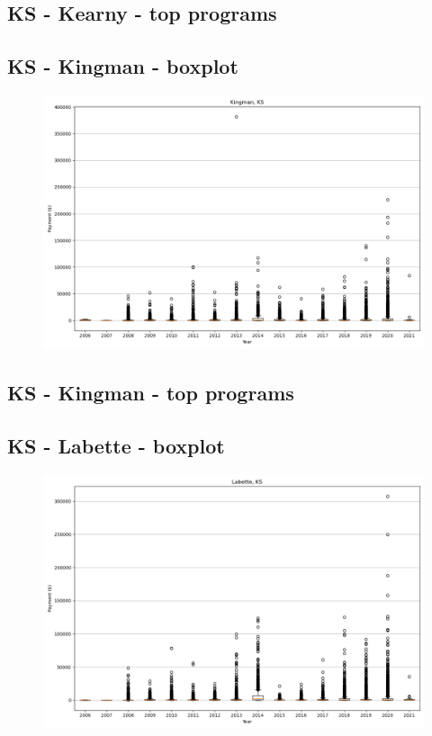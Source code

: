 \subsection*{KS - Kearny - top programs}

\newpage
\subsection*{KS - Kingman - boxplot}
\begin{figure}[h]
\centering
\includegraphics[width=7in]{../output/boxplots/counties/Kingman-KS_boxplot.png}
\end{figure}


\subsection*{KS - Kingman - top programs}

\newpage
\subsection*{KS - Labette - boxplot}
\begin{figure}[h]
\centering
\includegraphics[width=7in]{../output/boxplots/counties/Labette-KS_boxplot.png}
\end{figure}


